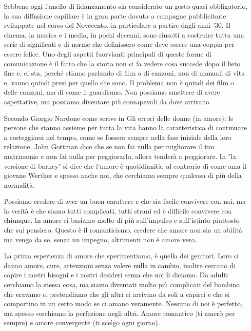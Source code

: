 \documentclass[12pt]{book} %
\begin{document}
Sebbene oggi l’anello di fidanzamento sia considerato un gesto quasi obbligatorio, la sua diffusione capillare è in gran parte dovuta a campagne pubblicitarie sviluppate nel corso del Novecento, in particolare a partire dagli anni ’30. Il
cinema, la musica e i media, in pochi decenni, sono riusciti a costruire tutta una serie di significati e di norme che
definissero come deve essere una coppia per essere felice. Uno degli aspetti fuorvianti principali di queste forme di
comunicazione è il fatto che la storia non ci fa vedere cosa succede dopo il lieto fine e, ci sta, perché stiamo
parlando di film o di canzoni, non di manuali di vita e, vanno quindi presi per quello che sono. Il problema non è
quindi dei film o delle canzoni, ma di come li guardiamo. Non possiamo smettere di avere aspettative, ma possiamo
diventare più consapevoli da dove arrivano.

Secondo Giorgio Nardone come scrive in Gli errori delle donne (in amore): le persone
che stanno assieme per tutta la vita hanno la caratteristica di continuare a corteggiarsi nel tempo, come se fossero
sempre nella fase iniziale della loro relazione. John Gottman dice che se non fai nulla per migliorare il tuo
matrimonio e non fai nulla per peggiorarlo, allora tenderà a peggiorare.
In "la versione di barney" si dice che l'amore è quotidianità, al contrario di come ama il giovane Werther e spesso anche noi, che cerchiamo sempre qualcosa di più della normalità.

Possiamo credere di aver un buon carattere e che sia facile convivere con noi, ma la verità è che siamo tutti
complicati, tutti strani ed è difficile convivere con chiunque. In amore ci basiamo molto di più sull'impulso e
sull'istinto piuttosto che sul pensiero. Questo è il romanticismo, credere che amare non sia un abilità ma venga da se,
senza un impegno, altrimenti non è amore vero.

La prima esperienza di amore che sperimentiamo, è quella dei genitori. Loro ci danno amore, cure, attenzioni senza
volere nulla in cambio, inoltre cercano di capire i nostri bisogni e i nostri desideri senza che noi li diciamo. Da
adulti cerchiamo la stessa cosa, ma siamo diventati molto più complicati del bambino che eravamo e, pretendiamo che
gli altri ci arrivino da soli a capirci e che si comportino in un certo modo se ci amano veramente. Nessuno di noi è
perfetto, ma spesso cerchiamo la perfezione negli altri. Amore romantico (ti amerò per sempre) e amore convergente (ti scelgo ogni giorno).
\end{document}
